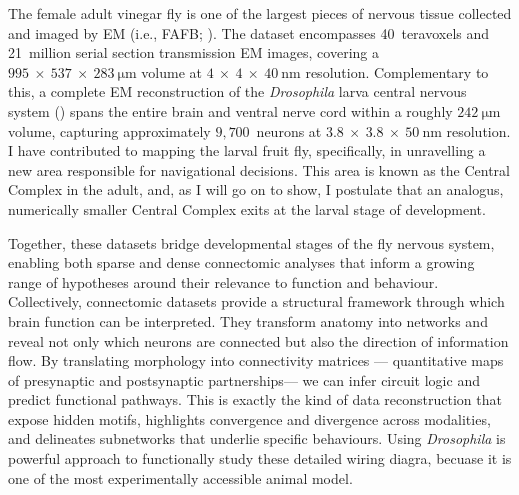 The female adult vinegar fly  is one of the largest pieces of nervous tissue collected and imaged by EM (i.e., FAFB; \citep{zheng2018complete}). The dataset encompasses 40~teravoxels and 21~million serial section transmission EM images, covering a $995~\times~537~\times~283~\si{\micro\metre}$ volume at $4~\times~4~\times~40~\si{\nano\metre}$ resolution. Complementary to this, a complete EM reconstruction of the \textit{Drosophila} larva central nervous system (\citep{winding2023connectome}) spans the entire brain and ventral nerve cord within a roughly $242~\si{\micro\metre}$ volume, capturing approximately $9{,}700$~neurons at $3.8~\times~3.8~\times~50~\si{\nano\metre}$ resolution. I have contributed to mapping the larval fruit fly, specifically, in unravelling a new area responsible for navigational decisions. This area is known as the Central Complex in the adult, and, as I will go on to show, I postulate that an analogus, numerically smaller Central Complex exits at the larval stage of development. 

Together, these datasets bridge developmental stages of the fly nervous system, enabling both sparse and dense connectomic analyses that inform a growing range of hypotheses around their relevance to function and behaviour. 
Collectively, connectomic datasets provide a structural framework through which brain function can be interpreted. They transform anatomy into networks and reveal not only which neurons are connected but also the direction of information flow. By translating morphology into connectivity matrices — quantitative maps of presynaptic and postsynaptic partnerships— we can infer circuit logic and predict functional pathways. This is exactly the kind of data reconstruction that expose hidden motifs, highlights convergence and divergence across modalities, and delineates subnetworks that underlie specific behaviours. Using \textit{Drosophila} is powerful approach to functionally study these detailed wiring diagra, becuase it is one of the most experimentally accessible animal model.  



